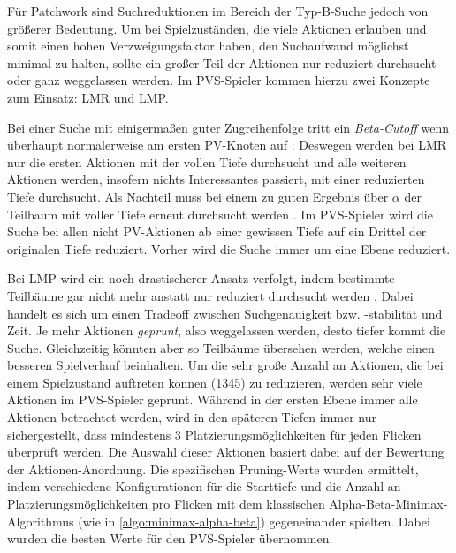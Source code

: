 \vspace*{-5cm}

\pagebreak

Für Patchwork sind Suchreduktionen im Bereich der Typ-B-Suche jedoch von größerer Bedeutung. Um bei Spielzuständen, die viele Aktionen erlauben und somit einen hohen Verzweigungsfaktor haben, den Suchaufwand möglichst minimal zu halten, sollte ein großer Teil der Aktionen nur reduziert durchsucht oder ganz weggelassen werden. Im \ac{PVS}-Spieler kommen hierzu zwei Konzepte zum Einsatz: \ac{LMR} und \ac{LMP}.

Bei einer Suche mit einigermaßen guter Zugreihenfolge tritt ein \hyperref[text:beta-cutoff]{\emph{Beta-Cutoff}} wenn überhaupt normalerweise am ersten \acs{PV}-Knoten auf \cite{2007.LMR}. Deswegen werden bei \ac{LMR} nur die ersten Aktionen mit der vollen Tiefe durchsucht und alle weiteren Aktionen werden, insofern nichts Interessantes passiert, mit einer reduzierten Tiefe durchsucht. Als Nachteil muss bei einem zu guten Ergebnis über $\alpha$ der Teilbaum mit voller Tiefe erneut durchsucht werden \cite{2007.LMR}. Im \ac{PVS}-Spieler wird die Suche bei allen nicht \ac{PV}-Aktionen ab einer gewissen Tiefe auf ein Drittel der originalen Tiefe reduziert. Vorher wird die Suche immer um eine Ebene reduziert.

Bei \ac{LMP} wird ein noch drastischerer Ansatz verfolgt, indem bestimmte Teilbäume gar nicht mehr anstatt nur reduziert durchsucht werden \cite{2023.StockfishTerminology}. Dabei handelt es sich um einen Tradeoff zwischen Suchgenauigkeit bzw. -stabilität und Zeit. Je mehr Aktionen \emph{geprunt}, also weggelassen werden, desto tiefer kommt die Suche. Gleichzeitig könnten aber so Teilbäume übersehen werden, welche einen besseren Spielverlauf beinhalten. Um die sehr große Anzahl an Aktionen, die bei einem Spielzustand auftreten können (1345) zu reduzieren, werden sehr viele Aktionen im \ac{PVS}-Spieler geprunt. Während in der ersten Ebene immer alle Aktionen betrachtet werden, wird in den späteren Tiefen immer nur sichergestellt, dass mindestens 3 Platzierungsmöglichkeiten für jeden Flicken überprüft werden. Die Auswahl dieser Aktionen basiert dabei auf der Bewertung der Aktionen-Anordnung. Die spezifischen Pruning-Werte wurden ermittelt, indem verschiedene Konfigurationen für die Starttiefe und die Anzahl an Platzierungsmöglichkeiten pro Flicken mit dem klassischen Alpha-Beta-Minimax-Algorithmus (wie in \ref{algo:minimax-alpha-beta}) gegeneinander spielten. Dabei wurden die besten Werte für den \ac{PVS}-Spieler übernommen.

